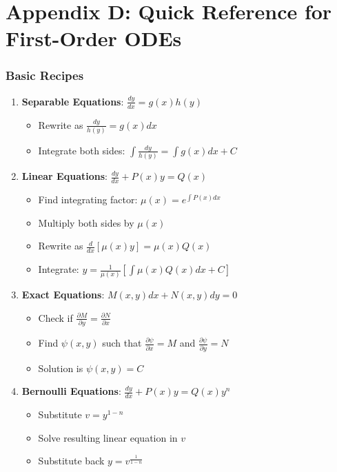 \newpage

\chapter*{Appendix D: Quick Reference for First-Order ODEs}

\subsection*{Basic Recipes}

\begin{enumerate}
\item \textbf{Separable Equations}: $\frac{dy}{dx} = g(x)h(y)$
   \begin{itemize}
   \item Rewrite as $\frac{dy}{h(y)} = g(x)dx$
   \item Integrate both sides: $\int \frac{dy}{h(y)} = \int g(x)dx + C$
   \end{itemize}

\item \textbf{Linear Equations}: $\frac{dy}{dx} + P(x)y = Q(x)$
   \begin{itemize}
   \item Find integrating factor: $\mu(x) = e^{\int P(x)dx}$
   \item Multiply both sides by $\mu(x)$
   \item Rewrite as $\frac{d}{dx}[\mu(x)y] = \mu(x)Q(x)$
   \item Integrate: $y = \frac{1}{\mu(x)}[\int \mu(x)Q(x)dx + C]$
   \end{itemize}

\item \textbf{Exact Equations}: $M(x,y)dx + N(x,y)dy = 0$
   \begin{itemize}
   \item Check if $\frac{\partial M}{\partial y} = \frac{\partial N}{\partial x}$
   \item Find $\psi(x,y)$ such that $\frac{\partial \psi}{\partial x} = M$ and $\frac{\partial \psi}{\partial y} = N$
   \item Solution is $\psi(x,y) = C$
   \end{itemize}

\item \textbf{Bernoulli Equations}: $\frac{dy}{dx} + P(x)y = Q(x)y^n$
   \begin{itemize}
   \item Substitute $v = y^{1-n}$
   \item Solve resulting linear equation in $v$
   \item Substitute back $y = v^{\frac{1}{1-n}}$
   \end{itemize}
\end{enumerate}

